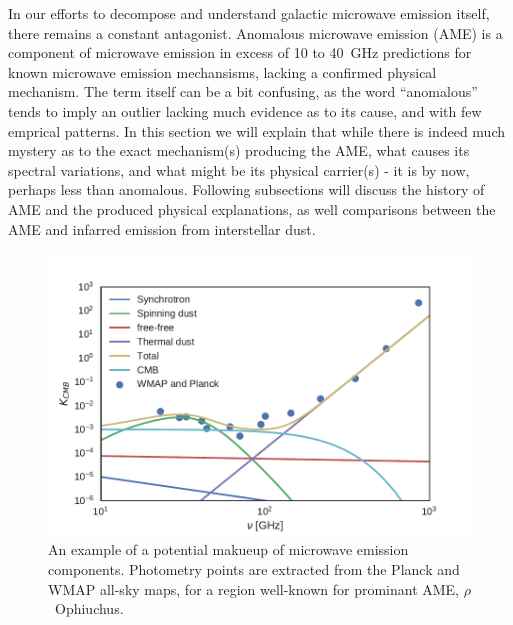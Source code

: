       In our efforts to decompose and understand galactic microwave emission itself, there remains a constant antagonist. Anomalous microwave emission (AME) is a component of microwave emission in excess of 10 to 40~GHz predictions for known microwave emission mechansisms, lacking a confirmed physical mechanism. The term itself can be a bit confusing, as the word ``anomalous'' tends to imply an outlier lacking much evidence as to its cause, and with few emprical patterns. In this section we will explain that while there is indeed much mystery as to the exact mechanism(s) producing the AME, what causes its spectral variations, and what might be its physical carrier(s) - it is by now, perhaps less than anomalous. Following subsections will discuss the history of AME and the produced physical explanations, as well comparisons between the AME and infarred emission from interstellar dust.

    \begin{figure}
      \centering
      \includegraphics[width=\textwidth]{../Plots/ch_intro/mw_foregrounds_demo_rOph.pdf}
        \caption{An example of a potential makueup of microwave emission components. Photometry points are extracted from the Planck and WMAP all-sky maps, for a region well-known for prominant AME, $\rho$~Ophiuchus. \citep{planckxx11}}
      \label{fig:mw_foregrounds_demo_rOph}
    \end{figure}


